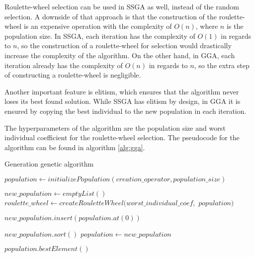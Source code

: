 Roulette-wheel selection can be used in SSGA as well, instead of the random selection. A downside of that approach is that the construction of the roulette-wheel is an expensive operation with the complexity of $O(n)$, where $n$ is the population size. In SSGA, each iteration has the complexity of $O(1)$ in regards to $n$, so the construction of a roulette-wheel for selection would drastically increase the complexity of the algorithm. On the other hand, in GGA, each iteration already has the complexity of $O(n)$ in regards to $n$, so the extra step of constructing a roulette-wheel is negligible.

Another important feature is elitism, which ensures that the algorithm never loses its best found solution. While SSGA has elitism by design, in GGA it is ensured by copying the best individual to the new population in each iteration.

The hyperparameters of the algorithm are the population size and worst individual coefficient for the roulette-wheel selection. The pseudocode for the algorithm can be found in algorithm \ref{alg:gga}.

\begin{algorithm}[!htbp]
    \caption{Generation genetic algorithm}
    \label{alg:gga}

    $population \gets initializePopulation(creation\_operator, population\_size)$\;

     {
        $new\_population \gets emptyList()$\;
        $roulette\_wheel \gets createRouletteWheel(worst\_individual\_coef, $ \newline \hspace*{1em} $ population)$\;

        $new\_population.insert(population.at(0))$\;


        $new\_population.sort()$\;
        $population \gets new\_population$\;
    }

    \Return $population.bestElement()$\;
    \end{algorithm}

